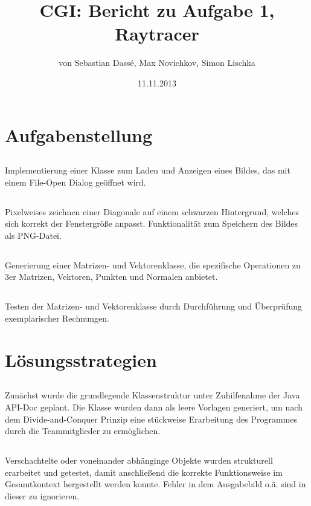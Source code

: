 \documentclass[11pt]{amsart}
\title{CGI: Bericht zu Aufgabe 1, Raytracer}
\author{von Sebastian Dass\'{e}, Max Novichkov, Simon Lischka }
\date{11.11.2013}
\begin{document}
\maketitle

\section{Aufgabenstellung}
\subsection{}
Implementierung einer Klasse zum Laden und Anzeigen eines Bildes, das mit einem File-Open Dialog ge\"offnet wird.

\subsection{}
Pixelweises zeichnen einer Diagonale auf einem schwarzen Hintergrund, welches sich korrekt der Fenstergr\"o\ss{}e anpasst. Funktionalit\"at zum Speichern des Bildes als PNG-Datei.

\subsection{}
Generierung einer Matrizen- und Vektorenklasse, die spezifische Operationen zu 3er Matrizen, Vektoren, Punkten und Normalen anbietet.

\subsection{}
Testen der Matrizen- und Vektorenklasse durch Durchf\"uhrung und \"Uberpr\"ufung exemplarischer Rechnungen.


\section{L\"osungsstrategien}
\subsection{}
Zun\"achst wurde die grundlegende Klassenstruktur unter Zuhilfenahme der Java API-Doc geplant. Die Klasse wurden 
dann als leere Vorlagen generiert, um nach dem Divide-and-Conquer Prinzip eine st\"uckweise Erarbeitung des Programmes
durch die Teammitglieder zu erm\"oglichen.

\subsection{}
Verschachtelte oder voneinander abh\"anginge Objekte wurden strukturell erarbeitet und getestet, damit anschlie\ss{}end 
die korrekte Funktionsweise im Gesamtkontext hergestellt werden konnte. Fehler in dem Ausgabebild o.\"ä. sind in dieser
zu ignorieren.
\end{document}
